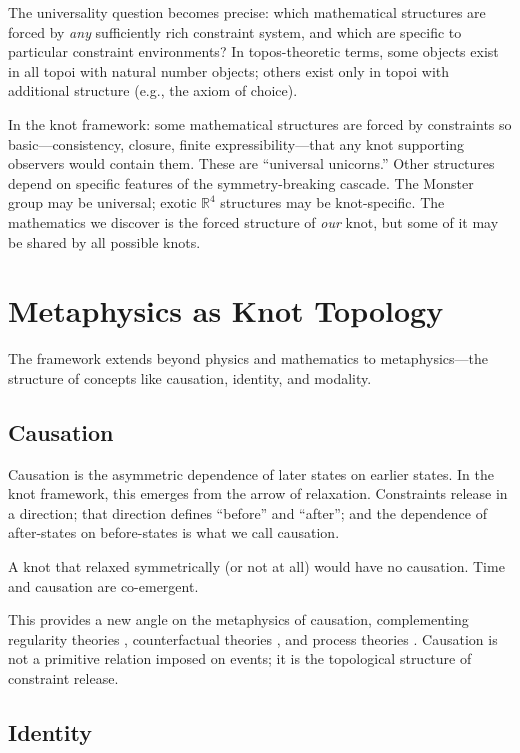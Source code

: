 \documentclass[11pt,a4paper]{article}
\begin{document}
The universality question becomes precise: which mathematical structures are forced by \emph{any} sufficiently rich constraint system, and which are specific to particular constraint environments? In topos-theoretic terms, some objects exist in all topoi with natural number objects; others exist only in topoi with additional structure (e.g., the axiom of choice).

In the knot framework: some mathematical structures are forced by constraints so basic---consistency, closure, finite expressibility---that any knot supporting observers would contain them. These are ``universal unicorns.'' Other structures depend on specific features of the symmetry-breaking cascade. The Monster group may be universal; exotic $\mathbb{R}^4$ structures may be knot-specific. The mathematics we discover is the forced structure of \emph{our} knot, but some of it may be shared by all possible knots.

\section{Metaphysics as Knot Topology}

The framework extends beyond physics and mathematics to metaphysics---the structure of concepts like causation, identity, and modality.

\subsection{Causation}

Causation is the asymmetric dependence of later states on earlier states. In the knot framework, this emerges from the arrow of relaxation. Constraints release in a direction; that direction defines ``before'' and ``after''; and the dependence of after-states on before-states is what we call causation.

A knot that relaxed symmetrically (or not at all) would have no causation. Time and causation are co-emergent.

This provides a new angle on the metaphysics of causation, complementing regularity theories \cite{hume1748}, counterfactual theories \cite{lewis1973}, and process theories \cite{salmon1984}. Causation is not a primitive relation imposed on events; it is the topological structure of constraint release.

\subsection{Identity}
\end{document}

